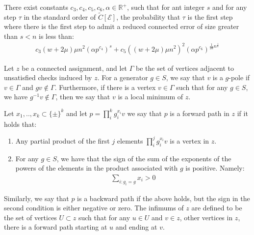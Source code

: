 




\begin{claim}
  There exist constants $c_{3}, c_{4}, c_{5}, c_{6}, \alpha \in \mathbb{R}^{+}$, such that for ant integer $s$ and for any step $\tau$ in the standard order of $\tilde{C}[\mathcal{E}]$, the probability that $\tau$ is the first step where there is the first step to admit a reduced connected error of size greater than $s < n$ is less than:
\begin{equation*}
  \begin{split}
    c_{3} (w+2\mu)\mu n^{2} \left( \alpha p^{c_{4}} \right)^{s} +  c_{5} ((w+2\mu)\mu n^{2})^{2} \left( \alpha p^{c_{6}} \right)^{\frac{1}{2d}n^{\frac{1}{d}}} 
  \end{split}
\end{equation*}
\end{claim}


\begin{definition}
Let $z$ be a connected assignment, and let $\Gamma$ be the set of vertices adjacent to unsatisfied checks induced by $z$. For a generator $g \in S$, we say that $v$ is a $g$-pole if $v \in \Gamma$ and $gv \notin \Gamma$. Furthermore, if there is a vertex $v \in \Gamma$ such that for any $g \in S$, we have $g^{-1}v \notin \Gamma$, then we say that $v$ is a local minimum of $z$. 

Let $x_{1},..,x_{k} \subset \{\pm \}^{k}$ and let $p = \prod_{i}^{k}g_{i}^{x_{i}}v$ we say that $p$ is a forward path in $z$ if  it holds that: 
\begin{enumerate}
  \item Any partial product of the first $j$ elements $\prod_{i}^{j}g_{i}^{x_{i}}v$ is a vertex in $z$. 
  \item
For any $g \in S$, we have that the sign of the sum of the exponents of the powers of the elements in the product associated with $g$ is positive. Namely:
    \begin{equation*}
      \begin{split}
        \sum_{i : g_{i} = g}x_{i} > 0
      \end{split}
    \end{equation*}
\end{enumerate}
Similarly, we say that $p$ is a backward path if the above holds, but the sign in the second condition is either negative or zero. The infimums of $z$ are defined to be the set of vertices $U \subset z$ such that for any $u \in U$ and $v \in z$, other vertices in $z$, there is a forward path starting at $u$ and ending at $v$.
\end{definition}
